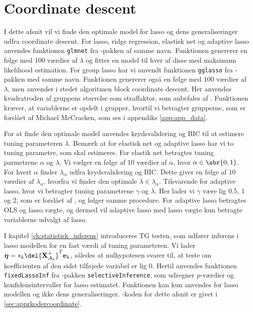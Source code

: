 \section{Coordinate descent}
I dette afsnit vil vi finde den optimale model for lasso og dens generaliseringer udfra coordinate descent.
For lasso, ridge regression, elastisk net og adaptive lasso anvendes funktionen \texttt{glmnet} fra \Rlang-pakken af samme navn.
Funktionen genererer en følge med 100 værdier af $\lambda$ og fitter en model til hver af disse med maksimum likelihood estimation.
For group lasso har vi anvendt funktionen \texttt{gglasso} fra \Rlang-pakken med samme navn. 
Funktionen genererer også en følge med 100 værdier af $\lambda$, men anvender i stedet algoritmen block coordinate descent. 
Her anvendes kvadratroden af gruppens størrelse som straffaktor, som anbefales af \citep{group_lasso}.
Funktionen kræver, at variablerne er opdelt i grupper, hvortil vi betragter grupperne, som er forslået af Michael McCracken, som ses i appendiks \ref{app:app_data}. 

For at finde den optimale model anvendes krydsvalidering og BIC til at estimere tuning parameteren $\lambda$.
Bemærk at for elastisk net og adaptive lasso har vi to tuning parametre, som skal estimeres. 
For elastik net betragtes tuning parmetrene $\alpha$ og $\lambda$.
Vi vælger en følge af 10 værdier af \(\alpha\), hvor $\alpha \in \sbr{0,1}$.
For hvert \(\alpha\) finder \(\lambda_\alpha\) udfra krydsvalidering og BIC.
Dette giver en følge af 10 værdier af \(\lambda_\alpha\), hvorfra vi finder den optimale \(\lambda \in \lambda_\alpha\).
Tilsvarende for adaptive lasso, hvor vi betragter tuning parametrene $\gamma$ og $\lambda$.
Her lader vi $\gamma$ være lig 0.5, 1 og 2, som er forslået af \citep{adaptive_lasso}, og følger samme procedure.
For adaptive lasso betragtes OLS og lasso vægte, og dermed vil adaptive lasso med lasso vægte kun betragte variablerne udvalgt af lasso.

I kapitel \ref{ch:statistisk_inferens} introduceres TG testen, som udfører inferens i lasso modellen for en fast værdi af tuning parameteren.
Vi lader $\boldsymbol{\eta} = s_k \del{\textbf{X}^+_{\mathcal{A}_k}}^T \mathbf{e}_k$, således at nulhypotesen svarer til, at teste om koefficienten af den sidst tilføjede variabel er lig 0.
Hertil anvendes funktionen \texttt{fixedLassoInf} fra \Rlang-pakken \texttt{selectiveInference}, som udregner \(p\)-værdier og konfidensintervaller for lasso estimatet.
Funktionen kan kun anvendes for lasso modellen og ikke dens generaliseringer. 
\Rlang-koden for dette afsnit er givet i  \ref{sec:apprkodercoordinate}.





